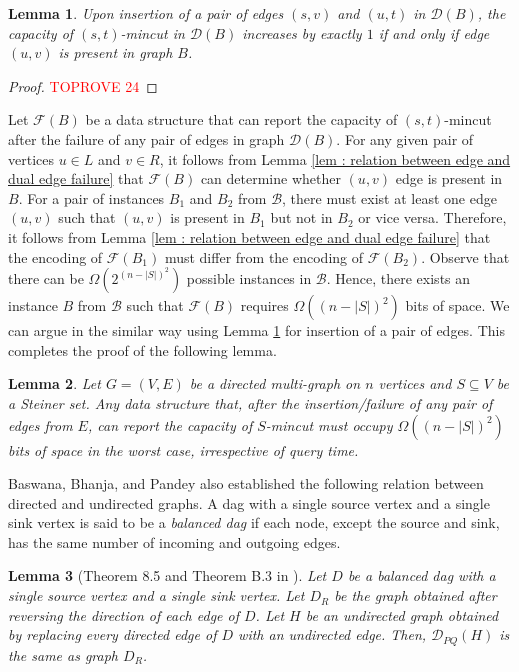 \documentclass[letterpaper,11pt]{article}
\newtheorem{lemma}{Lemma}[]
\begin{document}
\begin{lemma} \label{lem : relation between edge and dual edge insertion}
    Upon insertion of a pair of edges $(s,v)$ and $(u,t)$ in ${\mathcal D}(B)$, the capacity of $(s,t)$-mincut in ${\mathcal D}(B)$ increases by exactly $1$ if and only if edge $(u,v)$ is present in graph $B$. 
\end{lemma}
\begin{proof}\textcolor{red}{TOPROVE 24}\end{proof}
Let ${\mathcal F}(B)$ be a data structure that can report the capacity of $(s,t)$-mincut after the failure of any pair of edges in graph ${\mathcal D}(B)$. For any given pair of vertices $u\in L$ and $v\in R$, it follows from Lemma \ref{lem : relation between edge and dual edge failure} that ${\mathcal F}(B)$ can determine whether $(u,v)$ edge is present in $B$. For a pair of instances $B_1$ and $B_2$ from ${\mathcal B}$, there must exist at least one edge $(u,v)$ such that $(u,v)$ is present in $B_1$ but not in $B_2$ or vice versa.  
Therefore, it follows from Lemma \ref{lem : relation between edge and dual edge failure} that the encoding of ${\mathcal F}(B_1)$ must differ from the encoding of ${\mathcal F}(B_2)$. Observe that there can be $\Omega(2^{(n-|S|)^2})$ possible instances in ${\mathcal B}$. Hence, there exists an instance $B$ from ${\mathcal B}$ such that ${\mathcal F}(B)$ requires $\Omega((n-|S|)^2)$ bits of space. We can argue in the similar way using Lemma \ref{lem : relation between edge and dual edge insertion} for insertion of a pair of edges. This completes the proof of the following lemma.
\begin{lemma} \label{lem : dual edge failure directed}
    Let $G=(V,E)$ be a directed multi-graph on $n$ vertices and $S\subseteq V$ be a Steiner set. Any data structure that, after the insertion/failure of any pair of edges from $E$, can report the capacity of $S$-mincut must occupy $\Omega((n-|S|)^2)$ bits of space in the worst case, irrespective of query time.  
\end{lemma}
Baswana, Bhanja, and Pandey \cite{DBLP:journals/talg/BaswanaBP23} also established the following relation between directed and undirected graphs. A dag with a single source vertex and a single sink vertex is said to be a \textit{balanced dag} if each node, except the source and sink, has the same number of incoming and outgoing edges. 
\begin{lemma}[Theorem 8.5 and Theorem B.3 in \cite{DBLP:journals/talg/BaswanaBP23}] \label{lem : undirected graph exists}
    Let $D$ be a balanced dag with a single source vertex and a single sink vertex. Let $D_R$ be the graph obtained after reversing the direction of each edge of $D$. Let $H$ be an undirected graph obtained by replacing every directed edge of $D$ with an undirected edge. Then, ${\mathcal D}_{PQ}(H)$ is the same as graph $D_R$. 
\end{lemma}
\end{document}
